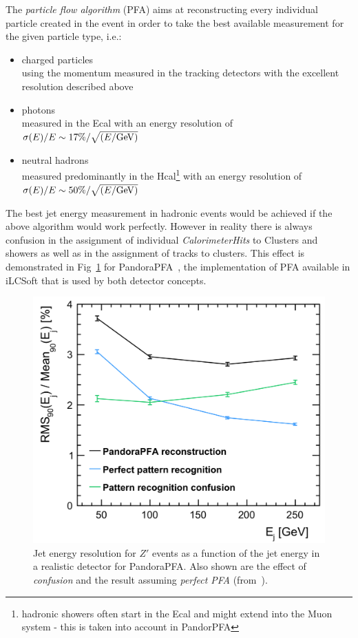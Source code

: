 The \emph{particle flow algorithm} (PFA) aims at reconstructing every individual particle created in the event in order
to take the best available measurement for the given particle type, i.e.:
\begin{itemize}
\item charged particles\\
  using the momentum measured in the tracking detectors with the excellent resolution described  above
\item photons\\
  measured in the Ecal with an energy resolution of $\sigma(E)/E \sim  17\% / \sqrt{(E/\rm{GeV})}$ %
\item neutral hadrons\\
  measured predominantly in the Hcal\footnote{hadronic showers often start in the Ecal and might extend into the Muon system -
    this is taken into account in PandorPFA} with an energy resolution of $\sigma(E)/E \sim  50\% / \sqrt{(E/\rm{GeV})}$ %
\end{itemize}

The best jet energy measurement in hadronic events would be achieved if the above algorithm would work perfectly. However in reality
there is always confusion in the assignment of individual \emph{CalorimeterHits} to Clusters and showers as well as in the assignment
of tracks to clusters. This effect is demonstrated in Fig~\ref{fig:pandorapfa_perfect} for PandoraPFA~\cite{Marshall:2015rfa}, the
implementation of PFA available in iLCSoft that is used by both detector concepts.

\begin{figure}
\begin{center}
\includegraphics[width=0.85\hsize]{chapters/figures/pandorapfa_perfect.png}
\end{center}
\caption{Jet energy resolution for $Z'$ events as a function of the jet energy in a realistic detector for PandoraPFA.
  Also shown are the effect of \emph{confusion} and the result assuming \emph{perfect PFA} (from~\cite{Marshall:2015rfa}).} 
\label{fig:pandorapfa_perfect}
\end{figure}

